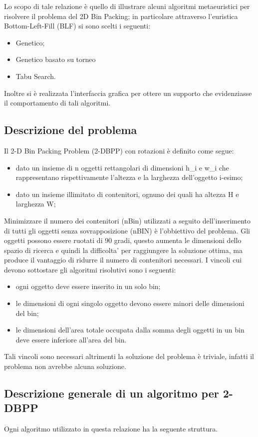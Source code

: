 Lo scopo di tale relazione è quello di illustrare alcuni algoritmi
metaeuristici per risolvere il problema del 2D Bin Packing; in particolare
attraverso l'euristica Bottom-Left-Fill (BLF) si sono scelti i seguenti:
\begin{itemize}
\item Genetico;
\item Genetico basato su torneo
\item Tabu Search.
\end{itemize}
Inoltre si è realizzata l'interfaccia grafica per ottere un supporto che
evidenziasse il comportamento di tali algoritmi.

\subsection{Descrizione del problema}
Il 2-D Bin Packing Problem (2-DBPP) con rotazioni è definito come
segue: 
\begin{itemize}
\item dato un insieme di n oggetti rettangolari di dimensioni h_{i} e w_{i}
che rappresentano rispettivamente l'altezza e la larghezza dell’oggetto
i-esimo;
\item dato un insieme illimitato di contenitori, ognuno dei quali ha altezza
H e larghezza W;
\end{itemize}
Minimizzare il numero dei contenitori (nBin) utilizzati a seguito
dell'inserimento di tutti gli oggetti senza sovrapposizione (nBIN) è
l'obbiettivo del problema. Gli oggetti possono essere ruotati di 90 gradi,
questo aumenta le dimensioni dello spazio di ricerca e quindi la difficolta’ per
raggiungere la soluzione ottima, ma produce il vantaggio di ridurre il numero di
contenitori necessari.
I vincoli cui devono sottostare gli algoritmi risolutivi sono i seguenti:
\begin{itemize}
 \item ogni oggetto deve essere inserito in un solo bin;
 \item le dimensioni di ogni singolo oggetto devono essere minori delle
dimensioni del bin;
 \item le dimensioni dell'area totale occupata dalla somma degli oggetti in un
bin deve essere inferiore all'area del bin.
\end{itemize}
Tali vincoli sono necessari altrimenti la soluzione del problema è triviale,
infatti il problema non avrebbe alcuna soluzione.

\subsection{Descrizione generale di un algoritmo per 2-DBPP}
Ogni algoritmo utilizzato in questa relazione ha la seguente struttura.

